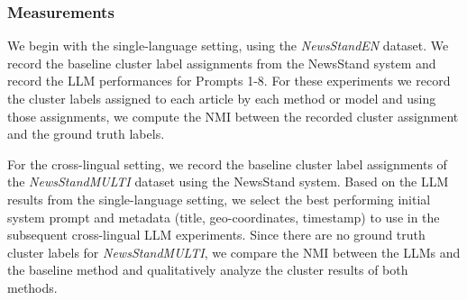 \subsubsection{Measurements}
We begin with the single-language setting, using the \emph{NewsStandEN} dataset.
We record the baseline cluster label assignments from the NewsStand system and record the LLM performances for Prompts 1-8.
For these experiments we record the cluster labels assigned to each article by each method or model and using those assignments, we compute the \ac{NMI} between the recorded cluster assignment and the ground truth labels.

For the cross-lingual setting, we record the baseline cluster label assignments of the \emph{NewsStandMULTI} dataset using the NewsStand system.
Based on the LLM results from the single-language setting, we select the best performing initial system prompt and metadata (title, geo-coordinates, timestamp) to use in the subsequent cross-lingual LLM experiments.
Since there are no ground truth cluster labels for \emph{NewsStandMULTI}, we compare the \ac{NMI} between the LLMs and the baseline method and qualitatively analyze the cluster results of both methods.





